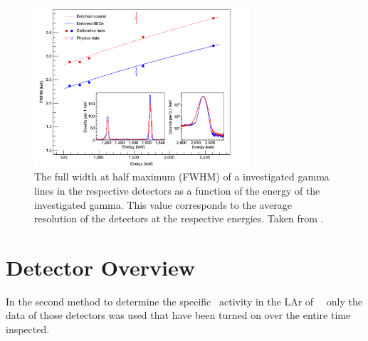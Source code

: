 \begin{figure}
	\centering
	\ifmakefigures%
	\includegraphics[width=80mm]{./Bilder/Aufloesung.png}
	\fi%
	\caption{
		The full width at half maximum (FWHM) of a investigated gamma lines in the respective detectors as a function of the energy of the investigated gamma.
		This value corresponds to the average resolution of the detectors at the respective energies.
		Taken from \cite{agostini_background_2017}.
	}
	\label{fig:Aufloesung}
\end{figure}


\chapter{Detector Overview}

In the second method to determine the specific \Kr\ activity in the LAr of \gerda\ \PII\ only the data of those detectors was used that have been turned on over the entire time inspected.


